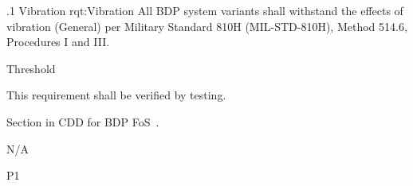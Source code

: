 

\ONERQMTVKSA
{\RqtNumberBase.1}
{Vibration}
{rqt:Vibration}
{All BDP system variants shall withstand the effects of vibration (General) per Military Standard 810H (MIL-STD-810H), Method 514.6, Procedures I and III.}
{
	\item [Phase 1] Threshold
}
{This requirement shall be verified by testing.}
{
\item [6.1] Section in CDD for BDP FoS~\cite{ref__BDP_FOS_CDD}.
}
{
	\item N/A
}
{P1}
